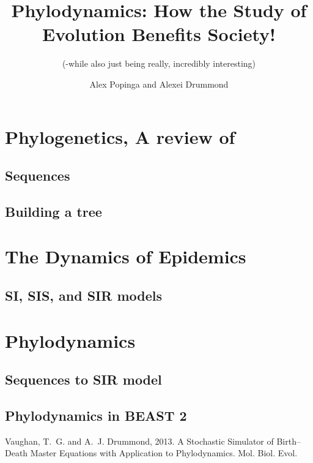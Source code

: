 \documentclass{scrartcl}
\begin{document}
\title{Phylodynamics:  How the Study of Evolution Benefits Society!}

\subtitle{(-while also just being really, incredibly interesting)}
\author{Alex Popinga and Alexei Drummond}
\date{}
\maketitle

\section{Phylogenetics, A review of}




\subsection{Sequences}

\subsection{Building a tree}



\section{The Dynamics of Epidemics}

\subsection{SI, SIS, and SIR models}

\section{Phylodynamics}

\subsection{Sequences to SIR model}

\subsection{Phylodynamics in BEAST 2}

\newpage
\begin{thebibliography}{99} %

{\sc Vaughan, T.~G.} and {\sc A.~J. Drummond}, 2013.
A Stochastic Simulator of Birth–Death Master Equations with Application to Phylodynamics.
\newblock Mol. Biol. Evol.
 
\end{thebibliography}

\end{document}
